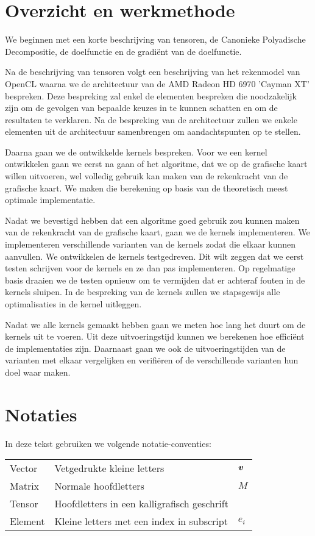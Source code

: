 \section{Overzicht en werkmethode}
We beginnen met een korte beschrijving van tensoren, de Canonieke Polyadische Decompositie, de doelfunctie en de gradi\"ent van de doelfunctie.

Na de beschrijving van tensoren volgt een beschrijving van het rekenmodel van OpenCL waarna we de architectuur van de AMD Radeon HD 6970 'Cayman XT' bespreken. Deze bespreking zal enkel de elementen bespreken die noodzakelijk zijn om de gevolgen van bepaalde keuzes in te kunnen schatten en om de resultaten te verklaren. Na de bespreking van de architectuur zullen we enkele elementen uit de architectuur samenbrengen om aandachtspunten op te stellen.

Daarna gaan we de ontwikkelde kernels bespreken. Voor we een kernel ontwikkelen gaan we eerst na gaan of het algoritme, dat we op de grafische kaart willen uitvoeren, wel volledig gebruik kan maken van de rekenkracht van de grafische kaart. We maken die berekening op basis van de theoretisch meest optimale implementatie.

Nadat we bevestigd hebben dat een algoritme goed gebruik zou kunnen maken van de rekenkracht van de grafische kaart, gaan we de kernels implementeren. We implementeren verschillende varianten van de kernels zodat die elkaar kunnen aanvullen. We ontwikkelen de kernels testgedreven. Dit wilt zeggen dat we eerst testen schrijven voor de kernels en ze dan pas implementeren. Op regelmatige basis draaien we de testen opnieuw om te vermijden dat er achteraf fouten in de kernels sluipen.
In de bespreking van de kernels zullen we stapsgewijs alle optimalisaties in de kernel uitleggen.

Nadat we alle kernels gemaakt hebben gaan we meten hoe lang het duurt om de kernels uit te voeren. Uit deze uitvoeringstijd kunnen we berekenen hoe effici\"ent de implementaties zijn. Daarnaast gaan we ook de uitvoeringstijden van de varianten met elkaar vergelijken en verifi\"eren of de verschillende varianten hun doel waar maken.

\newpage
\section{Notaties}
In deze tekst gebruiken we volgende notatie-conventies:

\begin{tabular}{l l l}
    Vector						& Vetgedrukte kleine letters					& $\boldsymbol{v}$\\
    Matrix 						& Normale hoofdletters							& $M$\\
    Tensor 						& Hoofdletters in een kalligrafisch geschrift	& \TT\\
    Element						& Kleine letters met een index in subscript	& $e_i$\\
\end{tabular}

